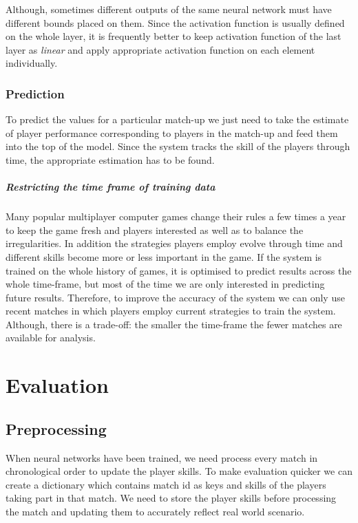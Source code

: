 \documentclass[12pt,a4paper]{book}
\begin{document}
Although, sometimes different outputs of the same neural network must have different bounds placed on them.
Since the activation function is usually defined on the whole layer, it is frequently better to keep activation function of the last layer as \emph{linear} and apply appropriate activation function on each element individually.

\subsection{Prediction}
To predict the values for a particular match-up we just need to take the estimate of player performance corresponding to players in the match-up and feed them into the top of the model.
Since the system tracks the skill of the players through time, the appropriate estimation has to be found.

\paragraph{Restricting the time frame of training data}
Many popular multiplayer computer games change their rules a few times a year to keep the game fresh and players interested as well as to balance the irregularities.
In addition the strategies players employ evolve through time and different skills become more or less important in the game.
If the system is trained on the whole history of games, it is optimised to predict results across the whole time-frame, but most of the time we are only interested in predicting future results.
Therefore, to improve the accuracy of the system we can only use recent matches in which players employ current strategies to train the system.
Although, there is a trade-off: the smaller the time-frame the fewer matches are available for analysis.


\chapter{Evaluation}
\section{Preprocessing}
When neural networks have been trained, we need process every match in chronological order to update the player skills.
To make evaluation quicker we can create a dictionary which contains match id as keys and skills of the players taking part in that match.
We need to store the player skills before processing the match and updating them to accurately reflect real world scenario.
\end{document}
